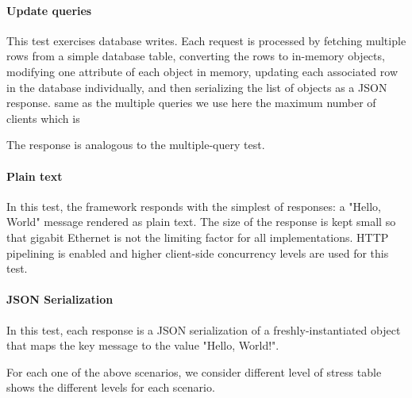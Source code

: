 \paragraph{Update queries}

This test exercises database writes. Each request is processed by fetching multiple rows from a simple database table, converting the rows to in-memory objects, modifying one attribute of each object in memory, updating each associated row in the database individually, and then serializing the list of objects as a JSON response.
same as the multiple queries  we use here  the maximum number of clients which is 

The response is analogous to the multiple-query test.

\paragraph{Plain text}
In this test, the framework responds with the simplest of responses: a "Hello, World" message rendered as plain text. The size of the response is kept small so that gigabit Ethernet is not the limiting factor for all implementations. HTTP pipelining is enabled and higher client-side concurrency levels are used for this test.

\paragraph{JSON Serialization}
In this test, each response is a JSON serialization of a freshly-instantiated object that maps the key message to the value "Hello, World!".

For each one of the above scenarios, we consider different level of stress table shows the different levels for each scenario.

